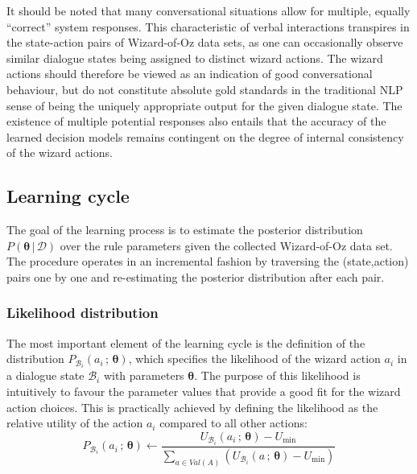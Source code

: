 It should be noted that many conversational situations allow for multiple, equally ``correct'' system responses.  This characteristic of verbal interactions transpires in the state-action pairs of Wizard-of-Oz data sets, as one can occasionally observe similar dialogue states being assigned to distinct wizard actions. The wizard actions should therefore be viewed as an indication of good conversational behaviour, but do not constitute absolute gold standards in the traditional NLP sense of being the uniquely appropriate output for the given dialogue state. The existence of multiple potential responses also entails that the accuracy of the learned decision models remains contingent on the degree of internal consistency of the wizard actions. 

\subsection{Learning cycle}
\label{sec:rule-supervised-learning}

The goal of the learning process is to estimate the posterior distribution $P(\boldsymbol\theta \, | \, \mathcal{D})$ over the rule parameters given the collected Wizard-of-Oz data set. The procedure operates in an incremental fashion by traversing the (state,action) pairs one by one and re-estimating the posterior distribution after each pair.  

\subsubsection*{Likelihood distribution}

The most important element of the learning cycle is the definition of the distribution $P_{\mathcal{B}_i}(a_i \, ; \, \boldsymbol\theta)$, which specifies the likelihood of the wizard action $a_i$ in a dialogue state $\mathcal{B}_i$ with parameters $\boldsymbol\theta$. The purpose of this likelihood is intuitively to favour the parameter values that provide a good fit for the wizard action choices. This is practically achieved by defining the likelihood as the relative utility of the action $a_i$ compared to all other actions: 
\begin{equation}
P_{\mathcal{B}_i}(a_i \, ; \, \boldsymbol\theta) \leftarrow \dfrac{U_{\mathcal{B}_i}(a_i \, ; \, \boldsymbol\theta) - U_{\mathrm{min}}}{\sum_{a \in Val(A)} (U_{\mathcal{B}_i}(a  \, ; \, \boldsymbol\theta) - U_{\mathrm{min}})} \label{eq:likelihood}
\end{equation}

